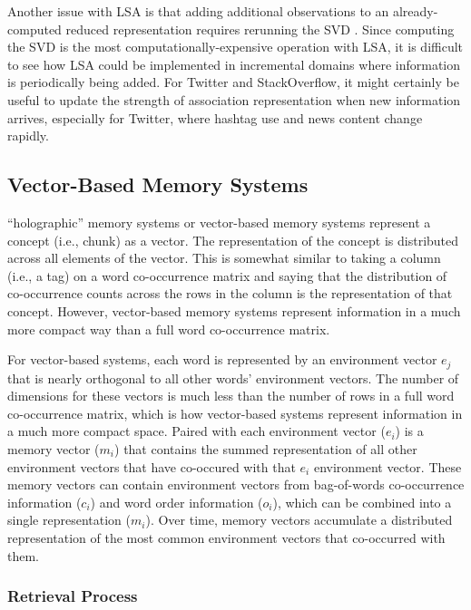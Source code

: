 \documentclass[man,floatsintext]{apa6}
\begin{document}
Another issue with LSA is that adding additional observations to an already-computed reduced representation requires rerunning the SVD \textcite{Farahat2004}.
Since computing the SVD is the most computationally-expensive operation with LSA, it is difficult to see how LSA could be implemented in incremental domains where information is periodically being added.
For Twitter and StackOverflow, it might certainly be useful to update the strength of association representation when new information arrives, especially for Twitter, where hashtag use and news content change rapidly.

\subsection{Vector-Based Memory Systems}

``holographic'' memory systems \parencite{Plate1995} or vector-based memory systems represent a concept (i.e., chunk) as a vector.
The representation of the concept is distributed across all elements of the vector.
This is somewhat similar to taking a column (i.e., a tag) on a word co-occurrence matrix and saying that the distribution of co-occurrence counts across the rows in the column is the representation of that concept.
However, vector-based memory systems represent information in a much more compact way than a full word co-occurrence matrix.

For vector-based systems, each word is represented by an environment vector $e_{j}$ that is nearly orthogonal to all other words' environment vectors.
The number of dimensions for these vectors is much less than the number of rows in a full word co-occurrence matrix, which is how vector-based systems represent information in a much more compact space.
Paired with each environment vector ($e_{i}$) is a memory vector ($m_{i}$) that contains the summed representation of all other environment vectors that have co-occured with that $e_{i}$ environment vector.
These memory vectors can contain environment vectors from bag-of-words co-occurrence information ($c_{i}$) and word order information ($o_{i}$), which can be combined into a single representation ($m_{i}$).
Over time, memory vectors accumulate a distributed representation of the most common environment vectors that co-occurred with them.

\subsubsection{Retrieval Process}
\end{document}
